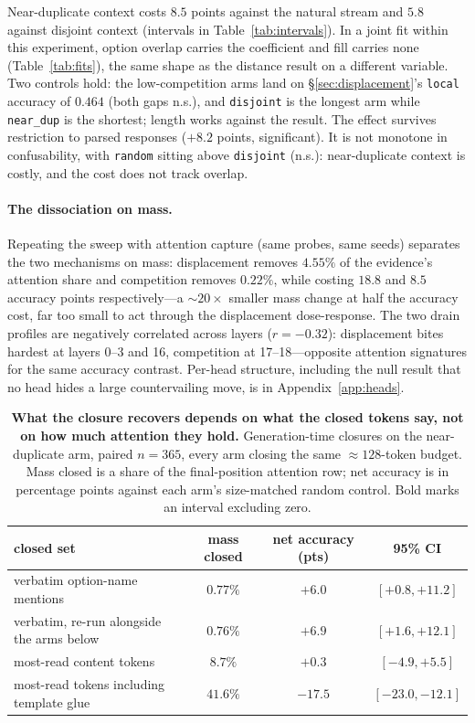 \documentclass{article}
\begin{document}
Near-duplicate context costs $8.5$ points against the natural stream and $5.8$ against
disjoint context (intervals in Table~\ref{tab:intervals}). In a joint fit within this experiment, option
overlap carries the coefficient and fill carries none
(Table~\ref{tab:fits}), the same shape as the distance result on a different variable. Two
controls hold: the low-competition arms land on \S\ref{sec:displacement}'s \texttt{local}
accuracy of $0.464$ (both gaps n.s.), and \texttt{disjoint} is the longest arm while \texttt{near\_dup} is the shortest; length
works against the result. The effect survives restriction to parsed responses ($+8.2$ points, significant). It is not
monotone in confusability, with \texttt{random} sitting above \texttt{disjoint} (n.s.):
near-duplicate context is costly, and the cost does not track overlap.

\paragraph{The dissociation on mass.}
Repeating the sweep with attention capture (same probes, same seeds) separates the two
mechanisms on mass: displacement removes $4.55\%$ of the evidence's attention share and
competition removes $0.22\%$, while costing $18.8$ and $8.5$ accuracy points respectively---a
${\sim}20\times$ smaller mass change at half the accuracy cost, far too small to act through
the displacement dose-response. The two drain profiles are negatively correlated across layers
($r{=}-0.32$): displacement bites hardest at layers 0--3 and 16, competition at 17--18---opposite attention
signatures for the same accuracy contrast. Per-head structure, including the null result that no
head hides a large countervailing move, is in Appendix~\ref{app:heads}.

\begin{table}[t]
  \centering\small
  \caption{\textbf{What the closure recovers depends on what the closed tokens say, not on how
  much attention they hold.} Generation-time closures on the near-duplicate arm, paired
  $n{=}365$, every arm closing the same ${\approx}128$-token budget. Mass closed is a share of
  the final-position attention row; net accuracy is in percentage points against each arm's
  size-matched random control. Bold marks an interval excluding zero.}
  \label{tab:closures}
  \setlength{\tabcolsep}{5pt}
  \begin{tabular}{lccc}
    \toprule
    closed set & mass closed & net accuracy (pts) & 95\% CI\\
    \midrule
    verbatim option-name mentions & $0.77\%$ & $\mathbf{+6.0}$ & $[+0.8,+11.2]$\\
    verbatim, re-run alongside the arms below & $0.76\%$ & $\mathbf{+6.9}$ & $[+1.6,+12.1]$\\
    most-read content tokens & $8.7\%$ & $+0.3$ & $[-4.9,+5.5]$\\
    most-read tokens including template glue & $41.6\%$ & $\mathbf{-17.5}$ & $[-23.0,-12.1]$\\
    \bottomrule
  \end{tabular}
\end{table}
\end{document}
